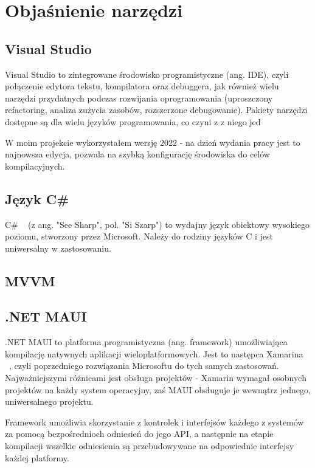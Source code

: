 \section{Objaśnienie narzędzi}

\subsection{Visual Studio}

Visual Studio \cite{visualStudio} to zintegrowane środowisko programistyczne (ang. IDE), czyli połączenie edytora tekstu,
kompilatora oraz debuggera, jak również wielu narzędzi przydatnych podczas rozwijania oprogramowania
(uproszczony refactoring, analiza zużycia zasobów, rozszerzone debugowanie). Pakiety narzędzi dostępne są dla wielu
języków programowania, co czyni z z niego jed

W moim projekcie wykorzystałem wersję 2022 - na dzień wydania pracy jest to najnowsza edycja,
pozwala na szybką konfigurację środowiska do celów kompilacyjnych.

\subsection{Język C\#}

C\# ~\cite{csharpDocs} (z ang. "See Sharp", pol. "Si Szarp") to wydajny język obiektowy wysokiego poziomu, 
stworzony przez Microsoft.
Należy do rodziny języków C i jest uniwersalny w zastosowaniu.

\subsection{MVVM}

\subsection{.NET MAUI}
.NET MAUI \cite{mauiDefinition} to platforma programistyczna (ang. framework) umożliwiająca
kompilację natywnych aplikacji wieloplatformowych. Jest to następca Xamarina ~\cite{xamarin},
czyli poprzedniego rozwiązania Microsoftu do tych samych zastosowań. Najważniejszymi różnicami
jest obsługa projektów - Xamarin wymagał osobnych projektów na każdy system operacyjny, zaś MAUI
obsługuje je wewnątrz jednego, uniwersalnego projektu.

Framework umożliwia skorzystanie z kontrolek i interfejsów każdego z systemów za pomocą 
bezpośrednioch odniesień do jego API, a następnie na etapie kompilacji wszelkie odniesienia są
przebudowywane na odpowiednie interfejsy każdej platformy.




